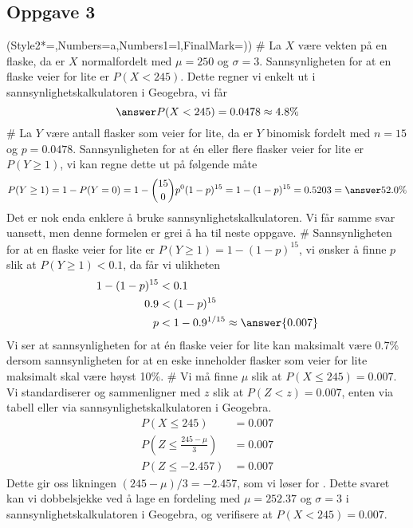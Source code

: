 \subsection*{Oppgave 3}
\begin{easylist}[enumerate]
	\ListProperties(Style2*=,Numbers=a,Numbers1=l,FinalMark={)})
	# La $X$ være vekten på en flaske, da er $X$ normalfordelt med $\mu = 250$ og $\sigma = 3$.
	Sannsynligheten for at en flaske veier for lite er $P(X< 245)$.
	Dette regner vi enkelt ut i sannsynlighetskalkulatoren i Geogebra, vi får
	\begin{equation*}
		\answer{P(X < 245) = 0.0478 \approx 4.8 \%}
	\end{equation*}
	# La $Y$ være antall flasker som veier for lite,
	da er $Y$ binomisk fordelt med $n = 15$ og $p = 0.0478$.
	Sannsynligheten for at én eller flere flasker veier for lite er $P(Y \geq 1)$, vi kan regne dette ut på følgende måte
	\begin{equation*}
		P(Y \geq 1) = 1 - P(Y = 0) = 1 - \binom{15}{0}p^0(1-p)^{15} = 1 - (1 - p)^{15} = 0.5203 = \answer{52.0\%}
	\end{equation*}
	Det er nok enda enklere å bruke sannsynlighetskalkulatoren. Vi får samme svar uansett, men denne formelen er grei å ha til neste oppgave.
	# Sannsynligheten for at en flaske veier for lite er $P(Y \geq 1) = 1 -  (1-p)^{15}$, vi ønsker å finne $p$ slik at $P(Y \geq 1) < 0.1$, da får vi ulikheten
	\begin{align*}
	1  - (1-p)^{15} & < 0.1 \\
	0.9 & < (1-p)^{15} \\
	p & < 1 - 0.9^{1/15} \approx \answer{0.007}
	\end{align*}
	Vi ser at sannsynligheten for at én flaske veier for lite kan maksimalt være 0.7\% dersom sannsynligheten for at en eske inneholder flasker som veier for lite maksimalt skal være høyst 10\%.
	# Vi må finne $\mu$ slik at $P(X \leq 245) = 0.007$. Vi standardiserer og sammenligner med $z$ slik at $P(Z < z) = 0.007$, enten via tabell eller via sannsynlighetskalkulatoren i Geogebra.
	\begin{align*}
		P(X \leq 245) &= 0.007 \\
		P\left(Z \leq \frac{245 - \mu}{3} \right) &= 0.007 \\
		P\left(Z \leq - 2.457 \right) &= 0.007 
	\end{align*}
	Dette gir oss likningen $(245 - \mu)/3 = - 2.457$, som vi løser for .
	Dette svaret kan vi dobbelsjekke ved å lage en fordeling med $\mu = 252.37$ og $\sigma = 3$ i sannsynlighetskalkulatoren i Geogebra, og verifisere at $P(X < 245) = 0.007$.
\end{easylist}








